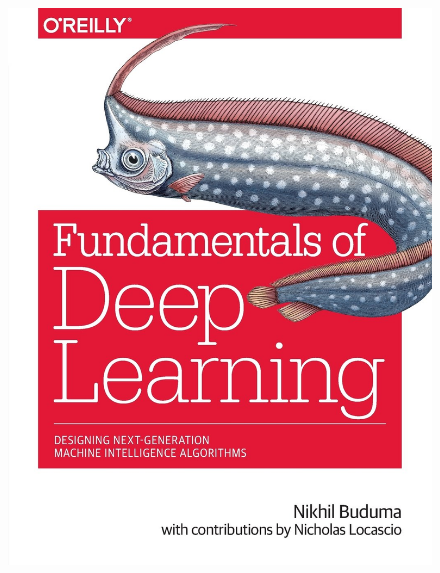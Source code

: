 \documentclass[a4paper,titlepaget]{article}
\begin{document}
\begin{figure}[htpb] 
\begin{minipage}{.2\textwidth}
\includegraphics[width=\textwidth, height=0.2\textheight]{images/obj1} 
\end{minipage}
\hspace{.05\textwidth}
\begin{minipage}{.2\textwidth}

\end{minipage}
\end{figure}
\end{document}
